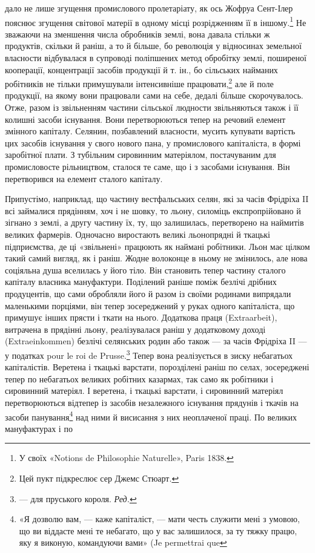 \parcont{}  %
дало не лише згущення промислового пролетаріату, як ось Жофруа
Сент-Ілер пояснює згущення світової матерії в одному
місці розрідженням її в іншому.\footnote{
У своїх «Notions de Philosophie Naturelle», Paris 1838.
} Не зважаючи на зменшення
числа обробників землі, вона давала стільки ж продуктів, скільки
й раніш, а то й більше, бо революція у відносинах земельної
власности відбувалася в супроводі поліпшених метод обробітку
землі, поширеної кооперації, концентрації засобів продукції й
т. ін., бо сільських найманих робітників не тільки примушували
інтенсивніше працювати,\footnote{
Цей пукт підкреслює сер Джемс Стюарт.
} але й поле продукції, на якому
вони працювали сами на себе, дедалі більше скорочувалось.
Отже, разом із звільненням частини сільської людности звільняються
також і її колишні засоби існування. Вони перетворюються
тепер на речовий елемент змінного капіталу. Селянин,
позбавлений власности, мусить купувати вартість цих засобів
існування у свого нового пана, у промислового капіталіста, в
формі заробітної плати. З тубільним сировинним матеріялом,
постачуваним для промисловосте рільництвом, сталося те саме,
що і з засобами існування. Він перетворився на елемент сталого
капіталу.

Припустімо, наприклад, що частину вестфальських селян,
які за часів Фрідріха II всі займалися прядінням, хоч і не шовку,
то льону, силоміць експропрійовано й зігнано з землі, а другу
частину їх, ту, що залишилась, перетворено на наймитів великих
фармерів. Одночасно виростають великі льонопрядні й ткацькі
підприємства, де ці «звільнені» працюють як наймані робітники.
Льон має цілком такий самий вигляд, як і раніш. Жодне волоконце
в ньому не змінилось, але нова соціяльна душа вселилась
у його тіло. Він становить тепер частину сталого капіталу власника
мануфактури. Поділений раніше поміж безлічі дрібних
продуцентів, що сами обробляли його й разом із своїми родинами
випрядали маленькими порціями, він тепер зосереджений у руках
одного капіталіста, що примушує інших прясти і ткати на
нього. Додаткова праця (Extraarbeit), витрачена в прядінні
льону, реалізувалася раніш у додатковому доході (Extraeinkommen)
безлічі селянських родин або також — за часів Фрідріха
II — у податках pour le roi de Prusse.\footnote*{
— для пруського короля. \emph{Ред.}
} Тепер вона реалізується
в зиску небагатьох капіталістів. Веретена і ткацькі варстати,
порозділені раніш по селах, зосереджені тепер по небагатьох
великих робітних казармах, так само як робітники і сировинний
матеріял. І веретена, і ткацькі варстати, і сировинний
матеріял перетворюються відтепер із засобів незалежного існування
прядунів і ткачів на засоби панування\footnote{
«Я дозволю вам, — каже капіталіст, — мати честь служити мені
з умовою, що ви віддасте мені те небагато, що у вас залишилося, за ту
тяжку працю, яку я виконую, командуючи вами» (Je permettrai que
} над ними й висисання
з них неоплаченої праці. По великих мануфактурах і по
\parbreak{}  %
